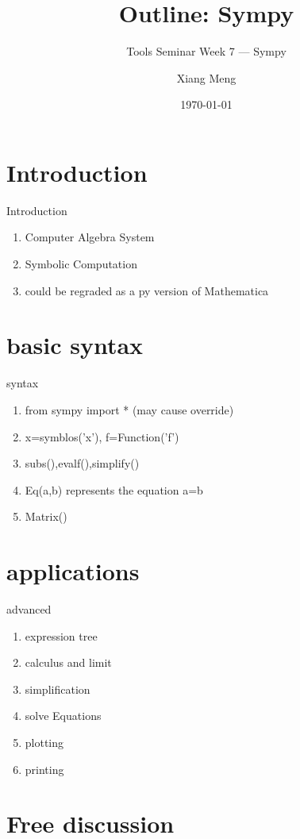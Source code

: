 \documentclass[english, nochinese]{../TeXTemplate/pkuslide}
\title{Outline: Sympy}
\subtitle{Tools Seminar Week 7 --- Sympy}
\author{Xiang Meng}
\date{\today}
\begin{document}
\begin{frame}
\titlepage
\end{frame}

\begin{frame}
\tableofcontents[subsectionstyle=hide]
\end{frame}

\section{Introduction}

\begin{frame}
\sectionpage
\end{frame}

\begin{frame}{Introduction}
\begin{enumerate}
\item Computer Algebra System
\item Symbolic Computation
\item could be regraded as a py version of Mathematica
\end{enumerate}
\end{frame}

\section{basic syntax}

\begin{frame}
\sectionpage
\end{frame}

\begin{frame}{syntax}
\begin{enumerate}
\item from sympy import * (may cause override)
\item x=symblos('x'), f=Function('f')
\item subs(),evalf(),simplify()
\item Eq(a,b) represents the equation a=b
\item Matrix()
\end{enumerate}
\end{frame}

\section{applications}

\begin{frame}
\sectionpage
\end{frame}

\begin{frame}{advanced}
\begin{enumerate}
\item expression tree
\item calculus and limit
\item simplification
\item solve Equations
\item plotting
\item printing
\end{enumerate}
\end{frame}

\section{Free discussion}

\begin{frame}
\sectionpage
\end{frame}
\end{document}
